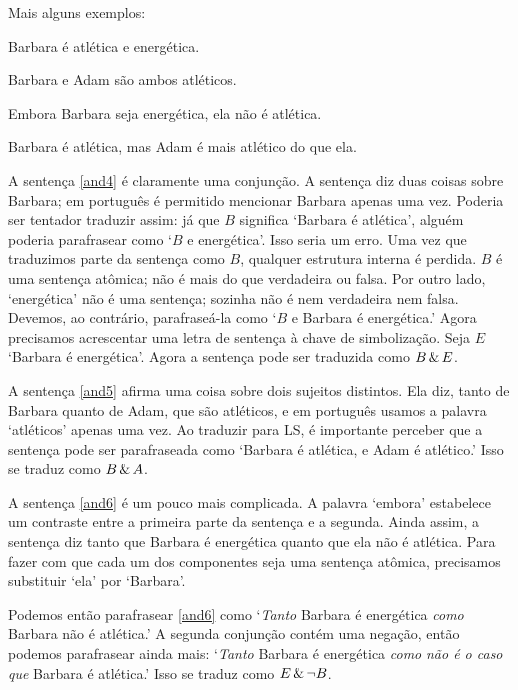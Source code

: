 Mais alguns exemplos:
\begin{earg}
\item[\ex{and4}] Barbara é atlética e energética.
\item[\ex{and5}] Barbara e Adam são ambos atléticos.
\item[\ex{and6}] Embora Barbara seja energética, ela não é atlética.
\item[\ex{and7}] Barbara é atlética, mas Adam é mais atlético do que ela.
\end{earg}

A sentença \ref{and4} é claramente uma conjunção. A sentença diz duas coisas sobre Barbara; em português é permitido mencionar Barbara apenas uma vez. Poderia ser tentador traduzir assim: já que $B$ significa `Barbara é atlética', alguém poderia parafrasear como `$B$ e energética'. Isso seria um erro. Uma vez que traduzimos parte da sentença como $B$, qualquer estrutura interna é perdida. $B$ é uma sentença atômica; não é mais do que verdadeira ou falsa. Por outro lado, `energética' não é uma sentença; sozinha não é nem verdadeira nem falsa. Devemos, ao contrário, parafraseá-la como `$B$ e Barbara é energética.' Agora precisamos acrescentar uma letra de sentença à chave de simbolização. Seja $E$ `Barbara é energética'. Agora a sentença pode ser traduzida como $B\,\&\, E$.


A sentença \ref{and5} afirma uma coisa sobre dois sujeitos distintos. Ela diz, tanto de Barbara quanto de Adam, que são atléticos, e em português usamos a palavra `atléticos' apenas uma vez. Ao traduzir para LS, é importante perceber que a sentença pode ser parafraseada como `Barbara é atlética, e Adam é atlético.' Isso se traduz como $B\,\&\, A$.

A sentença \ref{and6} é um pouco mais complicada. A palavra `embora' estabelece um contraste entre a primeira parte da sentença e a segunda. Ainda assim, a sentença diz tanto que Barbara é energética quanto que ela não é atlética. Para fazer com que cada um dos componentes seja uma sentença atômica, precisamos substituir `ela' por `Barbara'.

Podemos então parafrasear \ref{and6} como `\emph{Tanto} Barbara é energética \emph{como} Barbara não é atlética.' A segunda conjunção contém uma negação, então podemos parafrasear ainda mais: `\emph{Tanto} Barbara é energética \emph{como} \emph{não é o caso que} Barbara é atlética.' Isso se traduz como $E\,\&\,\neg B$.

